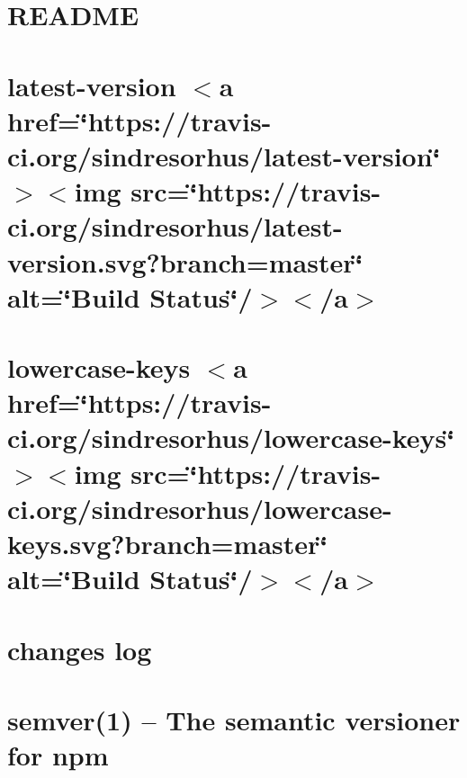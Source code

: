 \let\mypdfximage\pdfximage\def\pdfximage{\immediate\mypdfximage}\documentclass[twoside]{book}
\newcommand{\+}{\discretionary{\mbox{\scriptsize$\hookleftarrow$}}{}{}}
\begin{document}
\chapter{R\+E\+A\+D\+ME}
\label{md__c_1__git_hub__p_r_o_y_e_c_t_o-_i_i_i-_g_o_t_rest-api_node_modules_keyv__r_e_a_d_m_e}

\chapter{latest-\/version $<$a href=\char`\"{}https\+://travis-\/ci.\+org/sindresorhus/latest-\/version\char`\"{}$>$$<$img src=\char`\"{}https\+://travis-\/ci.\+org/sindresorhus/latest-\/version.\+svg?branch=master\char`\"{} alt=\char`\"{}\+Build Status\char`\"{}/$>$$<$/a$>$}
\label{md__c_1__git_hub__p_r_o_y_e_c_t_o-_i_i_i-_g_o_t_rest-api_node_modules_latest-version_readme}

\chapter{lowercase-\/keys $<$a href=\char`\"{}https\+://travis-\/ci.\+org/sindresorhus/lowercase-\/keys\char`\"{}$>$$<$img src=\char`\"{}https\+://travis-\/ci.\+org/sindresorhus/lowercase-\/keys.\+svg?branch=master\char`\"{} alt=\char`\"{}\+Build Status\char`\"{}/$>$$<$/a$>$}
\label{md__c_1__git_hub__p_r_o_y_e_c_t_o-_i_i_i-_g_o_t_rest-api_node_modules_lowercase-keys_readme}

\chapter{changes log}
\label{md__c_1__git_hub__p_r_o_y_e_c_t_o-_i_i_i-_g_o_t_rest-api_node_modules_make-dir_node_modules_semver__c_h_a_n_g_e_l_o_g}

\chapter{semver(1) -- The semantic versioner for npm}
\label{md__c_1__git_hub__p_r_o_y_e_c_t_o-_i_i_i-_g_o_t_rest-api_node_modules_make-dir_node_modules_semver__r_e_a_d_m_e}

\end{document}
